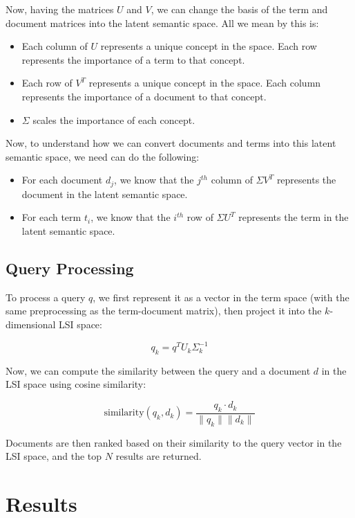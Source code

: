 \documentclass[a4paper, 12pt]{article}
\begin{document}
Now, having the matrices $U$ and $V$, we can change the basis of the term and document matrices into the latent semantic space. All we mean by this is:

\begin{itemize}
    \item Each column of $U$ represents a unique concept in the space. Each row represents the importance of a term to that concept.
    \item Each row of $V^T$ represents a unique concept in the space. Each column represents the importance of a document to that concept.
    \item $\Sigma$ scales the importance of each concept.
\end{itemize}

Now, to understand how we can convert documents and terms into this latent semantic space, we need can do the following:

\begin{itemize}
    \item For each document $d_j$, we know that the $j^{th}$ column of $\Sigma V^T$ represents the document in the latent semantic space.
    \item For each term $t_i$, we know that the $i^{th}$ row of $\Sigma U^T$ represents the term in the latent semantic space.
\end{itemize}

\subsection*{Query Processing}

To process a query $q$, we first represent it as a vector in the term space (with the same preprocessing as the term-document matrix), then project it into the $k$-dimensional LSI space:

\[ q_k = q^T U_k \Sigma_k^{-1} \]

\vspace{0.25cm}

Now, we can compute the similarity between the query and a document $d$ in the LSI space using cosine similarity:

\[ \text{similarity}(q_k, d_k) = \frac{q_k \cdot d_k}{\|q_k\| \|d_k\|} \]

Documents are then ranked based on their similarity to the query vector in the LSI space, and the top $N$ results are returned.


\section*{Results}
\end{document}
